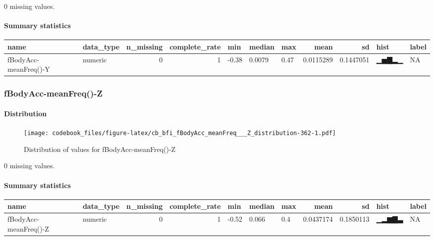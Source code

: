 \documentclass[
]{article}
\begin{document}
0 missing values.

\hypertarget{fBodyAcc_meanFreq___Y_summary}{%
\paragraph{Summary statistics}\label{fBodyAcc_meanFreq___Y_summary}}

\begin{longtable}[]{@{}llrrlllrrll@{}}
\toprule
name & data\_type & n\_missing & complete\_rate & min & median & max &
mean & sd & hist & label \\
\midrule
\endhead
fBodyAcc-meanFreq()-Y & numeric & 0 & 1 & -0.38 & 0.0079 & 0.47 &
0.0115289 & 0.1447051 & ▁▅▇▂▁ & NA \\
\bottomrule
\end{longtable}

\hypertarget{fBodyAcc_meanFreq___Z}{%
\subsubsection{fBodyAcc-meanFreq()-Z}\label{fBodyAcc_meanFreq___Z}}

\hypertarget{fBodyAcc_meanFreq___Z_distribution}{%
\paragraph{Distribution}\label{fBodyAcc_meanFreq___Z_distribution}}

\begin{figure}
\centering
\texttt{[image: codebook\_files/figure-latex/cb\_bfi\_fBodyAcc\_meanFreq\_\_\_Z\_distribution-362-1.pdf]}
\caption{Distribution of values for fBodyAcc-meanFreq()-Z}
\end{figure}

0 missing values.

\hypertarget{fBodyAcc_meanFreq___Z_summary}{%
\paragraph{Summary statistics}\label{fBodyAcc_meanFreq___Z_summary}}

\begin{longtable}[]{@{}llrrlllrrll@{}}
\toprule
name & data\_type & n\_missing & complete\_rate & min & median & max &
mean & sd & hist & label \\
\midrule
\endhead
fBodyAcc-meanFreq()-Z & numeric & 0 & 1 & -0.52 & 0.066 & 0.4 &
0.0437174 & 0.1850113 & ▁▂▆▇▃ & NA \\
\bottomrule
\end{longtable}
\end{document}
